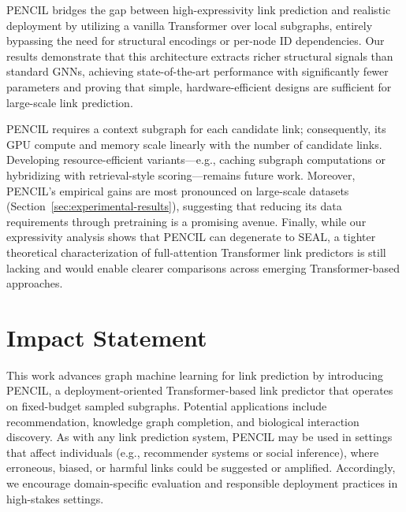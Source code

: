 \documentclass{article}
\theoremstyle{plain}
\theoremstyle{definition}
\theoremstyle{remark}
\begin{document}
PENCIL bridges the gap between high-expressivity link prediction and realistic deployment by utilizing a vanilla Transformer over local subgraphs, entirely bypassing the need for structural encodings or per-node ID dependencies. Our results demonstrate that this architecture extracts richer structural signals than standard GNNs, achieving state-of-the-art performance with significantly fewer parameters and proving that simple, hardware-efficient designs are sufficient for large-scale link prediction.

PENCIL requires a context subgraph for each candidate link; consequently, its GPU compute and memory scale linearly with the number of candidate links. Developing resource-efficient variants---e.g., caching subgraph computations or hybridizing with retrieval-style scoring---remains future work. Moreover, PENCIL's empirical gains are most pronounced on large-scale datasets (Section~\ref{sec:experimental-results}), suggesting that reducing its data requirements through pretraining is a promising avenue. Finally, while our expressivity analysis shows that PENCIL can degenerate to SEAL, a tighter theoretical characterization of full-attention Transformer link predictors is still lacking and would enable clearer comparisons across emerging Transformer-based approaches.

\section*{Impact Statement}

This work advances graph machine learning for link prediction by introducing PENCIL, a deployment-oriented Transformer-based link predictor that operates on fixed-budget sampled subgraphs. Potential applications include recommendation, knowledge graph completion, and biological interaction discovery. As with any link prediction system, PENCIL may be used in settings that affect individuals (e.g., recommender systems or social inference), where erroneous, biased, or harmful links could be suggested or amplified. Accordingly, we encourage domain-specific evaluation and responsible deployment practices in high-stakes settings.




\newpage
\appendix
\onecolumn
\end{document}
